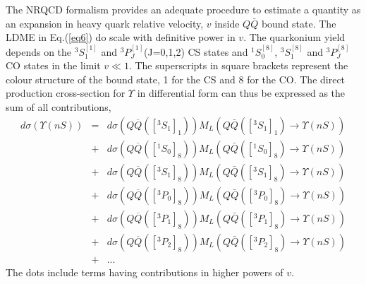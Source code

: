 \documentclass[review]{elsarticle}
\begin{document}
The NRQCD formalism provides an adequate procedure to estimate a quantity as an expansion in 
heavy quark relative velocity, $v$ inside $Q\bar{Q}$ bound state. The LDME in Eq.(\ref{eq6})
do scale with definitive power in $v$. The quarkonium yield depends on the $^3S_1^{[1]}$ 
and $^3P_J^{[1]}$(J=0,1,2) CS states and $^1S_0^{[8]}$, $^3S_1^{[8]}$ and $^3P_J^{[8]}$
CO states in the limit $v\ll 1$.
The superscripts in square brackets represent the colour structure of the bound state,
1 for the CS and 8 for the CO. The direct production cross-section for 
$\Upsilon$ in differential form can thus be expressed as the sum of all contributions,
\begin{eqnarray}
  d\sigma(\Upsilon(nS)) &=& d\sigma(Q\overline{Q}([^3S_1]_{1}))
  M_{L}(Q\bar{Q}([^3S_1]_{1})\rightarrow \Upsilon(nS)) \nonumber \\
  &+& d\sigma(Q\overline{Q}([^1S_0]_{8}))
  M_{L}(Q\bar{Q}([^1S_0]_{8})\rightarrow \Upsilon(nS)) \nonumber \\ 
  &+& d\sigma(Q\overline{Q}([^3S_1]_{8}))
  M_{L}(Q\bar{Q}([^3S_1]_{8})\rightarrow \Upsilon(nS)) \nonumber \\
  &+& d\sigma(Q\overline{Q}([^3P_0]_{8}))
  M_{L}(Q\bar{Q}([^3P_0]_{8})\rightarrow \Upsilon(nS))  \nonumber \\
  &+& d\sigma(Q\overline{Q}([^3P_1]_{8}))
  M_{L}(Q\bar{Q}([^3P_1]_{8}) \rightarrow \Upsilon(nS)) \nonumber \\
  &+& d\sigma(Q\overline{Q}([^3P_2]_{8}))
  M_{L}(Q\bar{Q}([^3P_2]_{8})\rightarrow \Upsilon(nS)) \nonumber \\
  &+& ...
  \label{eq8}
\end{eqnarray}
The dots include terms having contributions in higher powers of $v$.
\end{document}
